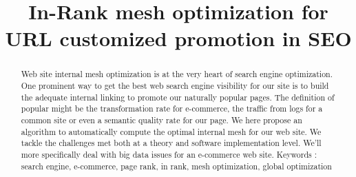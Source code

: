 \documentclass{iSWAGArticle}
\title{In-Rank mesh optimization for URL customized promotion in SEO}
\author{\iSWAGAuthor{Stefan Duprey\\
Cdiscount\\
stefan.duprey@cdiscount.com} \and \iSWAGAuthor{Second Author\\
Second University\\
second.author@university2.com}}
\begin{document}
\maketitle

\begin{abstract}
 Web site internal mesh optimization is at the very heart of search engine optimization. 
 One prominent way to get the best web search engine visibility for our site 
 is to build the adequate internal linking to promote our naturally popular pages. 
 The definition of popular might be the transformation rate for e-commerce, 
 the traffic from logs for a common site or even a semantic quality rate for our page. 
 We here propose an algorithm to automatically compute the optimal internal mesh for our web site.
 We tackle the challenges met both at a theory and software implementation level. 
 We'll more specifically deal with big data issues for an e-commerce web site.
 Keywords : search engine, e-commerce, page rank, in rank, mesh optimization, global optimization
\end{abstract}
\end{document}
